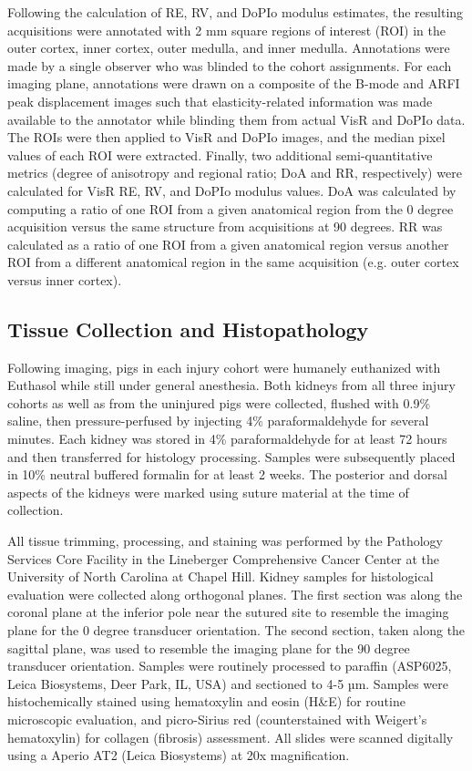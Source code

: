 Following the calculation of RE, RV, and DoPIo modulus estimates, the resulting acquisitions were annotated with 2 mm square regions of interest (ROI) in the outer cortex, inner cortex, outer medulla, and inner medulla. Annotations were made by a single observer who was blinded to the cohort assignments. For each imaging plane, annotations were drawn on a composite of the B-mode and ARFI peak displacement images such that elasticity-related information was made available to the annotator while blinding them from actual VisR and DoPIo data. The ROIs were then applied to VisR and DoPIo images, and the median pixel values of each ROI were extracted. Finally, two additional semi-quantitative metrics (degree of anisotropy and regional ratio; DoA and RR, respectively) were calculated for VisR RE, RV, and DoPIo modulus values. DoA was calculated by computing a ratio of one ROI from a given anatomical region from the 0 degree acquisition versus the same structure from acquisitions at 90 degrees. RR was calculated as a ratio of one ROI from a given anatomical region versus another ROI from a different anatomical region in the same acquisition (e.g. outer cortex versus inner cortex).

\subsection{Tissue Collection and Histopathology}

Following imaging, pigs in each injury cohort were humanely euthanized with Euthasol while still under general anesthesia. Both kidneys from all three injury cohorts as well as from the uninjured pigs were collected, flushed with 0.9\% saline, then pressure-perfused by injecting 4\% paraformaldehyde for several minutes. Each kidney was stored in 4\% paraformaldehyde for at least 72 hours and then transferred for histology processing. Samples were subsequently placed in 10\% neutral buffered formalin for at least 2 weeks. The posterior and dorsal aspects of the kidneys were marked using suture material at the time of collection.

All tissue trimming, processing, and staining was performed by the Pathology Services Core Facility in the Lineberger Comprehensive Cancer Center at the University of North Carolina at Chapel Hill. Kidney samples for histological evaluation were collected along orthogonal planes. The first section was along the coronal plane at the inferior pole near the sutured site to resemble the imaging plane for the 0 degree transducer orientation. The second section, taken along the sagittal plane, was used to resemble the imaging plane for the 90 degree transducer orientation. Samples were routinely processed to paraffin (ASP6025, Leica Biosystems, Deer Park, IL, USA) and sectioned to 4-5 µm. Samples were histochemically stained using hematoxylin and eosin (H\&E) for routine microscopic evaluation, and picro-Sirius red (counterstained with Weigert's hematoxylin) for collagen (fibrosis) assessment. All slides were scanned digitally using a Aperio AT2 (Leica Biosystems) at 20x magnification.

